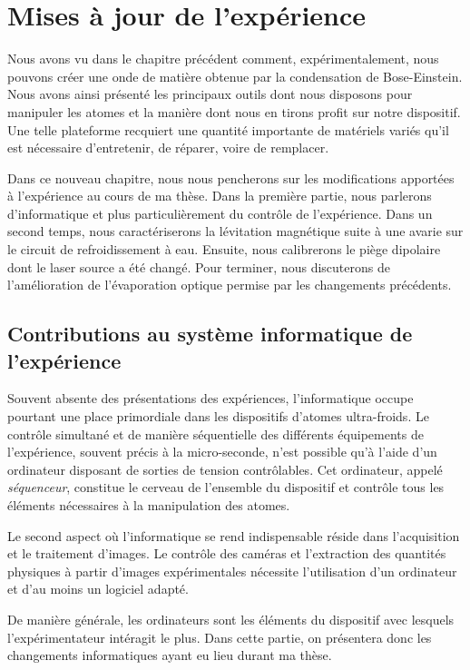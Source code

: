 \chapter{Mises à jour de l'expérience}
\label{ch:new_exp}

Nous avons vu dans le chapitre précédent comment, expérimentalement, nous pouvons créer une onde de matière obtenue par la condensation de Bose-Einstein. Nous avons ainsi présenté les principaux outils dont nous disposons pour manipuler les atomes et la manière dont nous en tirons profit sur notre dispositif. Une telle plateforme recquiert une quantité importante de matériels variés qu'il est nécessaire d'entretenir, de réparer, voire de remplacer. 

Dans ce nouveau chapitre, nous nous pencherons sur les modifications apportées à l'expérience au cours de ma thèse. Dans la première partie, nous parlerons d'informatique et plus particulièrement du contrôle de l'expérience. Dans un second temps, nous caractériserons la lévitation magnétique suite à une avarie sur le circuit de refroidissement à eau. Ensuite, nous calibrerons le piège dipolaire dont le laser source a été changé. Pour terminer, nous discuterons de l'amélioration de l'évaporation optique permise par les changements précédents.

\section{Contributions au système informatique de l'expérience}
Souvent absente des présentations des expériences, l'informatique occupe pourtant une place primordiale dans les dispositifs d'atomes ultra-froids. Le contrôle simultané et de manière séquentielle des différents équipements de l'expérience, souvent précis à la micro-seconde, n'est possible qu'à l'aide d'un ordinateur disposant de sorties de tension contrôlables. Cet ordinateur, appelé \emph{séquenceur}, constitue le cerveau de l'ensemble du dispositif et contrôle tous les éléments nécessaires à la manipulation des atomes.

Le second aspect où l'informatique se rend indispensable réside dans l'acquisition et le traitement d'images. Le contrôle des caméras et l'extraction des quantités physiques à partir d'images expérimentales nécessite l'utilisation d'un ordinateur et d'au moins un logiciel adapté. 

De manière générale, les ordinateurs sont les éléments du dispositif avec lesquels l'expérimentateur intéragit le plus. Dans cette partie, on présentera donc les changements informatiques ayant eu lieu durant ma thèse.

